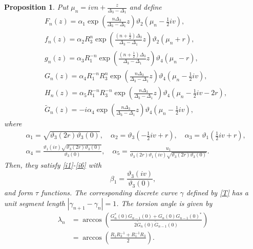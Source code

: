 \documentclass[10pt,leqno]{amsart}
\newtheorem{prop}[theorem]{Proposition}
\numberwithin{equation}{section}
\begin{document}
\begin{prop}\label{thm:PhDKal1}
Put $\mu_{n}=ivn+\frac{z}{\Delta_{3}-\Delta_{1}}$
and define
\begin{align}\label{t1}
&F_{n}(z)=\alpha_1\exp\left(\frac{n\Delta_{3}}{\Delta_{3}-\Delta_{1}}z\right)\vartheta_2\left(\mu_{n}-\frac{1}{2}iv\right),\\
&f_{n}(z)=\alpha_2 R_{3}^{n}\exp\left(\frac{\left(n+\frac{1}{2}\right)\Delta_{3}}{\Delta_{3}-\Delta_{1}}z\right)\vartheta_2\left(\mu_{n}+r\right), \nonumber\\
&g_{n}(z)=\alpha_3 R_{1}^{-n}\exp\left(\frac{\left(n+\frac{1}{2}\right)\Delta_{3}}{\Delta_{3}-\Delta_{1}}z\right)\vartheta_4\left(\mu_{n}-r\right), \nonumber\\
&G_{n}(z)=\alpha_4 R_{1}^{-n}R_{3}^{n}\exp\left(\frac{n\Delta_{3}}{\Delta_{3}-\Delta_{1}}z\right)\vartheta_4\left(\mu_{n}-\frac{1}{2}iv\right), \nonumber\\
&H_{n}(z)=\alpha_5 R_{1}^{-n}R_{3}^{-n}\exp\left(\frac{n\Delta_{3}}{\Delta_{3}-\Delta_{1}}z\right)\vartheta_4\left(\mu_{n}-\frac{1}{2}iv-2r\right), \nonumber \\
&\widetilde{G}_{n}(z)=-i\alpha_4\exp\left(\frac{n\Delta_{3}}{\Delta_{3}-\Delta_{1}}z\right)\vartheta_4\left(\mu_{n}-\frac{1}{2}iv\right), \nonumber
\end{align}
where
\begin{align}
&\alpha_1=\sqrt{\vartheta_3(2r)\vartheta_3(0)},\quad \alpha_2=\vartheta_3\left(-\frac{1}{2}iv+r\right),\quad \alpha_3=\vartheta_1\left(\frac{1}{2}iv+r\right),\nonumber\\
&\alpha_4=\frac{\vartheta_1(iv)\sqrt{\vartheta_3(2r)\vartheta_3(0)}}{\vartheta_3(0)},\quad \alpha_5=\frac{u_{1}}{\vartheta_3(2r)\vartheta_1(iv)\sqrt{\vartheta_3(2r)\vartheta_3(0)}}.\nonumber
\end{align}
Then, they satisfy \eqref{i1}-\eqref{i6} with
\begin{equation}\label{beta_1}
\beta_{1}=\frac{\vartheta_3(iv)}{\vartheta_3(0)},
\end{equation}
and form $\tau$ functions.
The corresponding discrete curve $\gamma$ defined by \eqref{T} has a unit segment length $\left|\gamma_{n+1}-\gamma_{n}\right|=1$.
The torsion angle is given by
\begin{equation}\label{lam1}
\begin{split}
\lambda_n&=\arccos\left(\frac{G_{n}^{*}(0)G_{n-1}(0)+G_{n}(0)G_{n-1}(0)^{*}}{2\widetilde{G}_{n}(0)\widetilde{G}_{n-1}(0)}\right)\\
&=\arccos\left(\frac{R_{1}R_{3}^{-1}+R_{1}^{-1}R_{3}}{2}\right).

\end{split}
\end{equation}
\end{prop}
\end{document}
